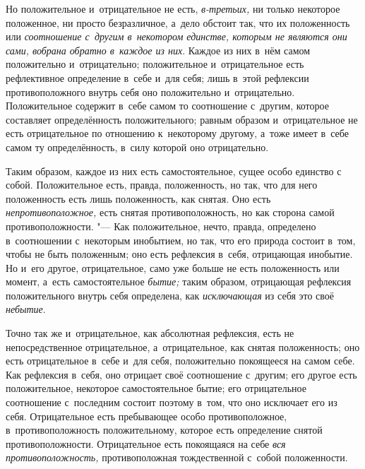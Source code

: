 Но положительное и~отрицательное не есть,
{\em в-третьих,} ни только некоторое положенное, ни
просто безразличное, а~дело обстоит так, что их положенность или
{\em соотношение с~другим в~некотором единстве, которым
не являются они сами, вобрана обратно в~каждое из них}. Каждое из них в~нём
самом положительно и~отрицательно; положительное и~отрицательное есть
рефлективное определение в~себе и~для себя; лишь в~этой рефлексии
противоположного внутрь себя оно положительно и~отрицательно. Положительное
содержит в~себе самом то соотношение с~другим, которое составляет
определённость положительного; равным образом и~отрицательное не есть
отрицательное по отношению к~некоторому другому, а~тоже имеет в~себе самом
ту определённость, в~силу которой оно отрицательно.

Таким образом, каждое из них есть самостоятельное, сущее особо единство с
собой. Положительное есть, правда, положенность, но так, что для него
положенность есть лишь положенность, как снятая. Оно есть
{\em непротивоположное,} есть снятая противоположность,
но как сторона самой противоположности. "--- Как положительное, нечто, правда,
определено в~соотношении с~некоторым инобытием, но так, что его природа
состоит в~том, чтобы не быть положенным; оно есть рефлексия в~себя,
отрицающая инобытие. Но и~его другое, отрицательное, само уже больше не
есть положенность или момент, а~есть самостоятельное
{\em бытие;} таким образом, отрицающая рефлексия
положительного внутрь себя определена, как
{\em исключающая} из себя это своё {\em небытие}.

Точно так же и~отрицательное, как абсолютная рефлексия, есть не
непосредственное отрицательное, а~отрицательное, как снятая положенность;
оно есть отрицательное в~себе и~для себя, положительно покоящееся на самом
себе. Как рефлексия в~себя, оно отрицает своё соотношение с~другим; его
другое есть положительное, некоторое самостоятельное бытие; его
отрицательное соотношение с~последним состоит поэтому в~том, что оно
исключает его из себя. Отрицательное есть пребывающее особо
противоположное, в~противоположность положительному, которое есть
определение снятой противоположности. Отрицательное есть покоящаяся на себе
{\em вся противоположность,} противоположная
тождественной с~собой положенности.

